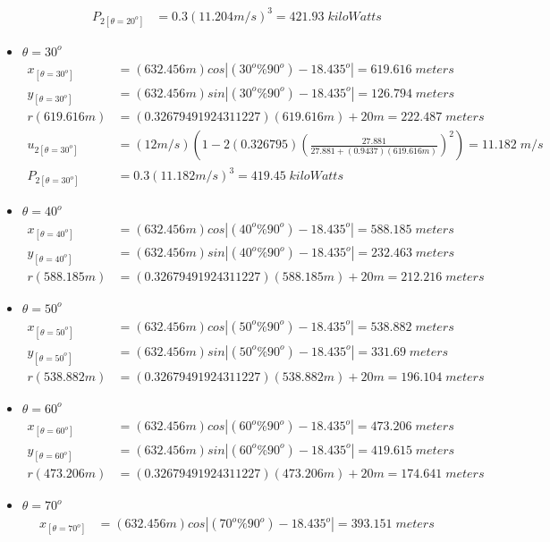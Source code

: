 \begin{itemize}
\begin{align*}
		P_{2[\theta=20^o]} &=0.3(11.204m/s)^3  =421.93\;kiloWatts
\end{align*}
\item $\theta=30^o$
	\begin{align*}%
		x_{[\theta=30^o]} &=(632.456m) cos\left| (30^o\%90^o) - 18.435^o \right|  =619.616\;meters \\
		y_{[\theta=30^o]} &=(632.456m) sin\left| (30^o\%90^o) - 18.435^o \right|  =126.794\;meters \\
		r(619.616m) &=(0.32679491924311227)(619.616m)+20m  =222.487\;meters\\
		u_{2[\theta=30^o]} &=(12m/s)\left( 1-2(0.326795)\left( \frac{27.881}{27.881+(0.9437)(619.616m)} \right)^2 \right) =11.182\;m/s \\
		P_{2[\theta=30^o]} &=0.3(11.182m/s)^3  =419.45\;kiloWatts
\end{align*}
\item $\theta=40^o$
	\begin{align*}%
		x_{[\theta=40^o]} &=(632.456m) cos\left| (40^o\%90^o) - 18.435^o \right|  =588.185\;meters \\
		y_{[\theta=40^o]} &=(632.456m) sin\left| (40^o\%90^o) - 18.435^o \right|  =232.463\;meters \\
		r(588.185m) &=(0.32679491924311227)(588.185m)+20m  =212.216\;meters\end{align*}
\item $\theta=50^o$
	\begin{align*}%
		x_{[\theta=50^o]} &=(632.456m) cos\left| (50^o\%90^o) - 18.435^o \right|  =538.882\;meters \\
		y_{[\theta=50^o]} &=(632.456m) sin\left| (50^o\%90^o) - 18.435^o \right|  =331.69\;meters \\
		r(538.882m) &=(0.32679491924311227)(538.882m)+20m  =196.104\;meters\end{align*}
\item $\theta=60^o$
	\begin{align*}%
		x_{[\theta=60^o]} &=(632.456m) cos\left| (60^o\%90^o) - 18.435^o \right|  =473.206\;meters \\
		y_{[\theta=60^o]} &=(632.456m) sin\left| (60^o\%90^o) - 18.435^o \right|  =419.615\;meters \\
		r(473.206m) &=(0.32679491924311227)(473.206m)+20m  =174.641\;meters\end{align*}
\item $\theta=70^o$
	\begin{align*}%
		x_{[\theta=70^o]} &=(632.456m) cos\left| (70^o\%90^o) - 18.435^o \right|  =393.151\;meters \\

\end{align*}
\end{itemize}
